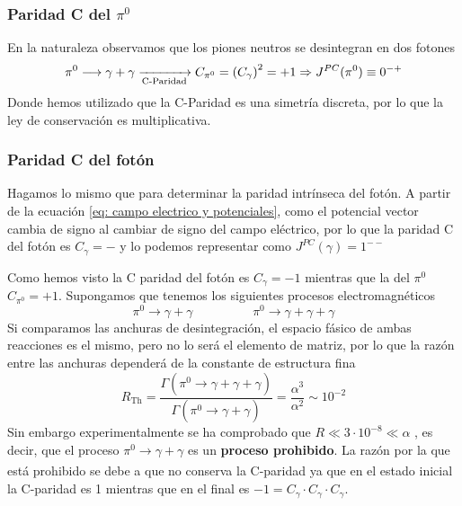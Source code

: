 \subsubsection{Paridad C del ${\pi^0}$}
En la naturaleza observamos que los piones neutros se desintegran en dos fotones 
\begin{equation*}
    \pi^0\longrightarrow \gamma+\gamma \xrightarrow[\text{C-Paridad}]{} C_{\pi^0}=\qty (C_\gamma)^2=+1\Rightarrow J^{PC}(\pi^0)\equiv 0^{-+}
\end{equation*}
Donde hemos utilizado que la C-Paridad es  una simetría discreta, por lo que la ley de conservación es multiplicativa.
\subsubsection{Paridad C del fotón}
Hagamos lo mismo que para determinar la paridad intrínseca del fotón. A partir de la ecuación \ref{eq: campo electrico y potenciales}, como el potencial vector cambia de signo al cambiar de signo del campo eléctrico, por lo que la paridad C del fotón es $C_\gamma=-$ y lo podemos representar como $J^{PC}(\gamma)=1^{--}$

\begin{tcolorbox}[colback=airforceblue!20, colframe=airforceblue, title=Ejemplo: Desintegracion del pion neutro en 2 y 3 fotones]
 Como hemos visto la C paridad del fotón es $C_\gamma=-1$ mientras que la del $\pi^0$ $C_{\pi^0}=+1$. Supongamos que tenemos los siguientes procesos electromagnéticos
 \begin{equation*}
     \pi^0\longrightarrow \gamma+\gamma \hspace{2cm} \pi^0\longrightarrow \gamma+\gamma+\gamma
 \end{equation*}
 Si comparamos las anchuras de desintegración, el espacio fásico de ambas reacciones es el mismo, pero no lo será el elemento de matriz, por lo que la razón entre las anchuras dependerá de la constante de estructura fina
 \begin{equation*}
     R_\mathrm{Th}=\frac{\Gamma(\pi^0\xrightarrow[]{} \gamma+\gamma+\gamma)}{\Gamma(\pi^0\xrightarrow[]{} \gamma+\gamma)}=\frac{\alpha^3}{\alpha^2}\sim 10^{-2}
 \end{equation*}
 Sin embargo experimentalmente se ha comprobado que $R\ll 3\cdot 10 ^{-8}\ll\alpha$ \footnotemark, es decir, que el proceso $\pi^0\xrightarrow[]{} \gamma+\gamma$ es un \textbf{proceso prohibido}. La razón por la que está prohibido se debe a que no conserva la C-paridad ya que en el estado inicial la C-paridad es 1 mientras que en el final es $-1=C_\gamma \cdot C_\gamma \cdot C_\gamma$.
\end{tcolorbox}

